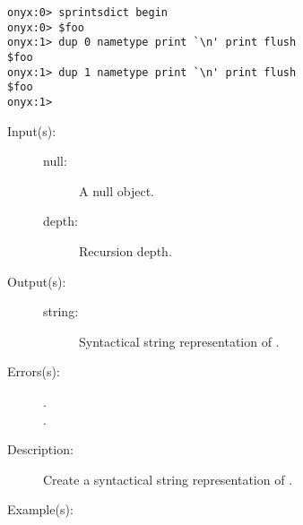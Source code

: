 \begin{description}
\begin{description}
\begin{verbatim}
onyx:0> sprintsdict begin
onyx:0> $foo
onyx:1> dup 0 nametype print `\n' print flush
$foo
onyx:1> dup 1 nametype print `\n' print flush
$foo
onyx:1>
		\end{verbatim}
	\end{description}
\label{sprintsdict:nulltype}
\item[{\onyxop{null depth}{nulltype}{string}}: ]
	\begin{description}\item[]
	\item[Input(s): ]
		\begin{description}\item[]
		\item[null: ]
			A null object.
		\item[depth: ]
			Recursion depth.
		\end{description}
	\item[Output(s): ]
		\begin{description}\item[]
		\item[string: ]
			Syntactical string representation of .
		\end{description}
	\item[Errors(s): ]
		\begin{description}\item[]
		\item[.]
		\item[.]
		\end{description}
	\item[Description: ]
		Create a syntactical string representation of .
	\item[Example(s): ]\begin{verbatim}


\end{verbatim}
\end{description}
\end{description}
